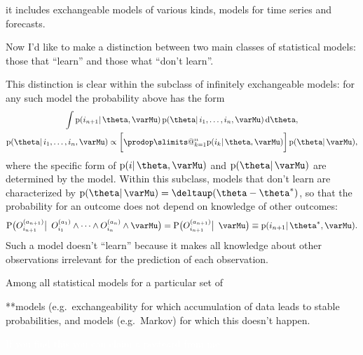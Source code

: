 \documentclass[\ifafour a4paper,12pt,\else a5paper,10pt,\fi%
onecolumn,oneside,article,%
british%
]{memoir}
\makeatletter
\theoremstyle{remark}
\theoremstyle{innote}
\def\prod{\DOTSI\prodop\slimits@}
\newcommand*{\delt}{\deltaup}%
\newcommand*{\di}{\mathrm{d}}%
\newcommand*{\pf}{\mathrm{p}}%
\newcommand*{\p}{\mathrm{P}}%
\renewcommand*{\|}{\mathpunct{|}}
\newcommand*{\bigcond}{\mathpunct{\big|\ }}%
\newcommand*{\eg}{{e.g.}}
\newcommand*{\yO}[2]{O^{(#1)}_{#2}}
\newcommand*{\yM}{\varMu}
\newcommand*{\ytheta}{\theta^*}
\makeatother
\begin{document}
it includes exchangeable models of various
kinds, models for time series and forecasts.

\medskip

Now I'd like to make a distinction between two main classes of statistical
models: those that \enquote{learn} and those what \enquote{don't learn}.

This distinction is clear within the subclass of infinitely exchangeable
models: for any such model the probability above has the form
\begin{subequations} \label{eq:example_exchangeable}
  \begin{gather}
    \int \pf(i_{n+1} \| \theta,\yM)\,
    \pf(\theta \| i_{1}, \dotsc, i_{n}, \yM)\,\di\theta,
    \\
    \pf(\theta \| i_{1}, \dotsc, i_{n}, \yM) \propto
    \biggl[  \prod_{k=1}^n \pf(i_{k} \| \theta,\yM)  \biggr]
    \,
    \pf(\theta \|\yM), 
  \end{gather}
\end{subequations}
where the specific form of $\pf(i \| \theta,\yM)$ and $\pf(\theta \|\yM)$
are determined by the model. Within this subclass, models that don't learn
are characterized by $\pf(\theta \|\yM) = \delt(\theta-\ytheta)$, so that
the probability for an outcome does not depend on knowledge of other outcomes:
\begin{equation}
  \label{eq:extreme_exchang}
  \p\bigl(\yO{a_{n+1}}{i_{n+1}} \bigcond
  \yO{a_{1}}{i_{1}} \land \dotsb \land \yO{a_{n}}{i_{n}} \land \yM \bigr)
  =
  \p\bigl(\yO{a_{n+1}}{i_{n+1}} \bigcond \yM \bigr)
  \equiv \pf(i_{n+1} \| \ytheta,\yM).
\end{equation}
Such a model doesn't \enquote{learn} because it makes all knowledge about
other observations irrelevant for the prediction of each observation.



Among all statistical models for a particular set of 

**models (\eg\ exchangeability for which accumulation of data leads to
stable probabilities, and models (\eg\ Markov) for which this doesn't
happen.


\textcolor{white}{If you find this you can claim a postcard from me.}
%

\setlength{\intextsep}{0.5ex}%
\end{document}
